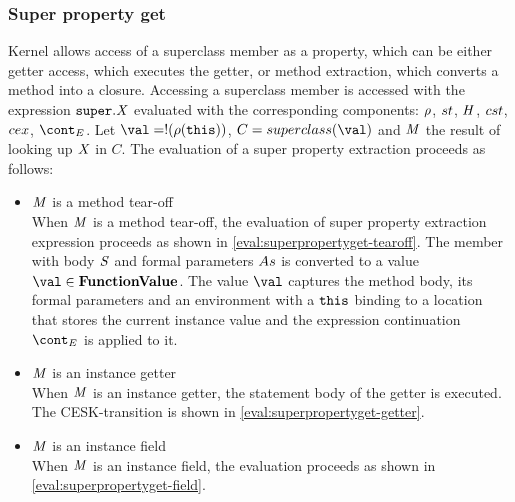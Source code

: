\documentclass{article}
\begin{document}
\subsubsection{Super property get}
\label{subsubsec:super-property-get}
Kernel allows access of a superclass member as a property, which can be either getter access, which executes the getter, or method extraction, which converts a method into a closure.
\noindent
Accessing a superclass member is accessed with the expression $\tt{super}.\mathit{X}$ evaluated with the corresponding components: $\rho$, $st$, $\mathit{H}$, $cst$, $cex$, $\econt$.
Let $\val = \deref{(\env(\this))}$, $C = \superclass{\val}$ and $\mathit{M}$ the result of looking up $\mathit{X}$ in $C$.
The evaluation of a super property extraction proceeds as follows:
\begin{itemize}
\item $\mathit{M}$ is a method tear-off\\
When $\mathit{M}$ is a method tear-off, the evaluation of super property extraction expression proceeds as shown in \eqref{eval:superpropertyget-tearoff}.
The member with body $\mathit{S}$ and formal parameters $As$ is converted to a value $\val \in \dfunval$.
The value $\val$ captures the method body, its formal parameters and an environment with a $\tt{this}$ binding to a location that stores the current instance value and the expression continuation $\econt$ is applied to it.
\item $\mathit{M}$ is an instance getter\\
When $\mathit{M}$ is an instance getter, the statement body of the getter is executed.
The CESK-transition is shown in \eqref{eval:superpropertyget-getter}.
\item $\mathit{M}$ is an instance field\\
When $\mathit{M}$ is an instance field, the evaluation proceeds as shown in \eqref{eval:superpropertyget-field}.
\end{itemize}
\end{document}
